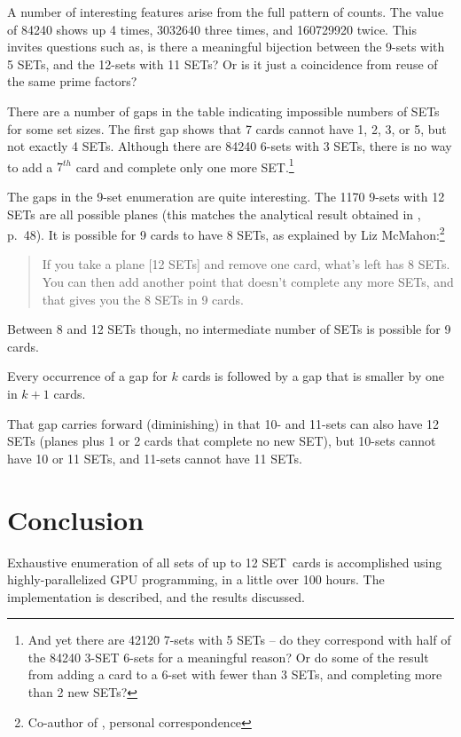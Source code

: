 \documentclass[10pt]{amsart}
\newcommand{\SETb}{SET\texttrademark\ } %
\begin{document}
A number of interesting features arise from the full pattern of counts. The
value of 84240 shows up 4 times, 3032640 three times, and 160729920 twice. This
invites questions such as, is there a meaningful bijection between the 9-sets
with 5 SETs, and the 12-sets with 11 SETs? Or is it just a coincidence from
reuse of the same prime factors?


There are a number of gaps in the table indicating impossible numbers of SETs
for some set sizes. The first gap shows that 7 cards cannot have 1, 2, 3, or 5,
but not exactly 4 SETs. Although there are 84240 6-sets with 3 SETs, there is no
way to add a $7^{th}$ card and complete only one more SET.\footnote{And yet
  there are 42120 7-sets with 5 SETs -- do they correspond with half of the
  84240 3-SET 6-sets for a meaningful reason? Or do some of the result from
  adding a card to a 6-set with fewer than 3 SETs, and completing more than 2
  new SETs?}

The gaps in the 9-set enumeration are quite interesting. The 1170 9-sets with 12
SETs are all possible planes (this matches the analytical result obtained in
\cite{JOS}, p.~48). It is possible for 9 cards to have 8 SETs, as explained by
Liz McMahon:\footnote{Co-author of \cite{JOS}, personal correspondence}
\begin{quote}
If you take a plane [12 SETs] and remove one card, what’s left has 8 SETs.  You
can then add another point that doesn’t complete any more SETs, and that gives
you the 8 SETs in 9 cards.
\end{quote}
Between 8 and 12 SETs though, no intermediate number of SETs is possible for 9
cards.

Every occurrence of a gap for $k$ cards is followed by a gap that is smaller by
one in $k+1$ cards. 


That gap carries forward (diminishing) in that 10- and 11-sets can also
have 12 SETs (planes plus 1 or 2 cards that complete no new SET), but 10-sets
cannot have 10 or 11 SETs, and 11-sets cannot have 11 SETs.



\section{Conclusion}
Exhaustive enumeration of all sets of up to 12 \SETb cards is accomplished using
highly-parallelized GPU programming, in a little over 100 hours. The
implementation is described, and the results discussed.
\end{document}
